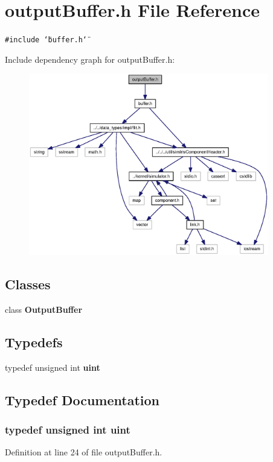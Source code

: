 \section{outputBuffer.h File Reference}
\label{outputBuffer_8h}
{\tt \#include \char`\"{}buffer.h\char`\"{}}\par


Include dependency graph for outputBuffer.h:\nopagebreak
\begin{figure}[H]
\begin{center}
\leavevmode
\includegraphics[width=297pt]{outputBuffer_8h__incl}
\end{center}
\end{figure}
\subsection*{Classes}
\begin{CompactItemize}
\item 
class {\bf OutputBuffer}
\end{CompactItemize}
\subsection*{Typedefs}
\begin{CompactItemize}
\item 
typedef unsigned int {\bf uint}
\end{CompactItemize}


\subsection{Typedef Documentation}
\subsubsection[{uint}]{\setlength{\rightskip}{0pt plus 5cm}typedef unsigned int {\bf uint}}\label{outputBuffer_8h_91ad9478d81a7aaf2593e8d9c3d06a14}




Definition at line 24 of file outputBuffer.h.